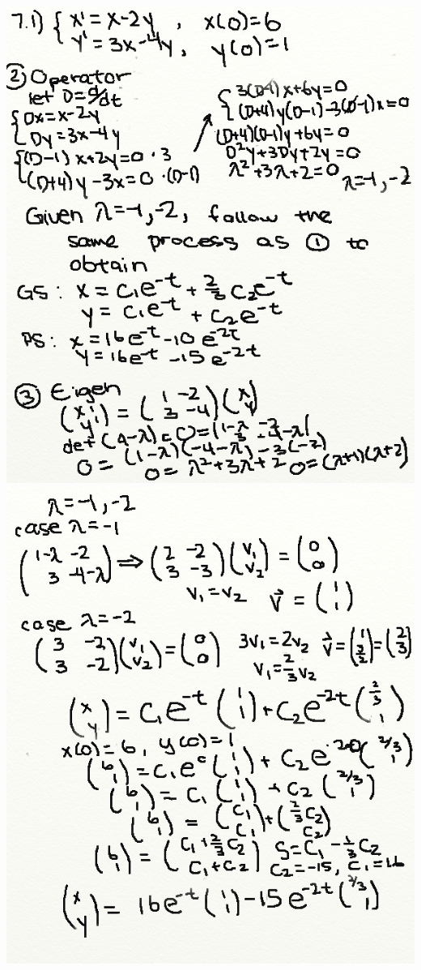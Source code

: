 \documentclass{article}
\begin{document}
\includegraphics[width=\textwidth,height=\textheight,keepaspectratio]{homework7q1p2.png}\clearpage{}
\includegraphics[width=\textwidth,height=\textheight,keepaspectratio]{homework7q1p3.png}\clearpage{}
\end{document}
